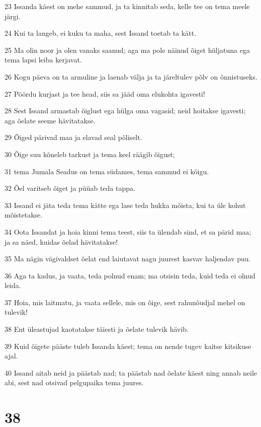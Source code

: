 \par 23 Issanda käest on mehe sammud, ja ta kinnitab seda, kelle tee on tema meele järgi.
\par 24 Kui ta langeb, ei kuku ta maha, sest Issand toetab ta kätt.
\par 25 Ma olin noor ja olen vanaks saanud; aga ma pole näinud õiget hüljatuna ega tema lapsi leiba kerjavat.
\par 26 Kogu päeva on ta armuline ja laenab välja ja ta järeltulev põlv on õnnistuseks.
\par 27 Pöördu kurjast ja tee head, siis sa jääd oma elukohta igavesti!
\par 28 Sest Issand armastab õiglust ega hülga oma vagasid; neid hoitakse igavesti; aga õelate seeme hävitatakse.
\par 29 Õiged pärivad maa ja elavad seal põliselt.
\par 30 Õige suu kõneleb tarkust ja tema keel räägib õigust;
\par 31 tema Jumala Seadus on tema südames, tema sammud ei kõigu.
\par 32 Õel varitseb õiget ja püüab teda tappa.
\par 33 Issand ei jäta teda tema kätte ega lase teda hukka mõista, kui ta üle kohut mõistetakse.
\par 34 Oota Issandat ja hoia kinni tema teest, siis ta ülendab sind, et sa pärid maa; ja sa näed, kuidas õelad hävitatakse!
\par 35 Ma nägin vägivaldset õelat end laiutavat nagu juurest kasvav haljendav puu.
\par 36 Aga ta kadus, ja vaata, teda polnud enam; ma otsisin teda, kuid teda ei olnud leida.
\par 37 Hoia, mis laitmatu, ja vaata sellele, mis on õige, sest rahunõudjal mehel on tulevik!
\par 38 Ent üleastujad kaotatakse täiesti ja õelate tulevik hävib.
\par 39 Kuid õigete pääste tuleb Issanda käest; tema on nende tugev kaitse kitsikuse ajal.
\par 40 Issand aitab neid ja päästab nad; ta päästab nad õelate käest ning annab neile abi, sest nad otsivad pelgupaika tema juures.

\chapter{38}

